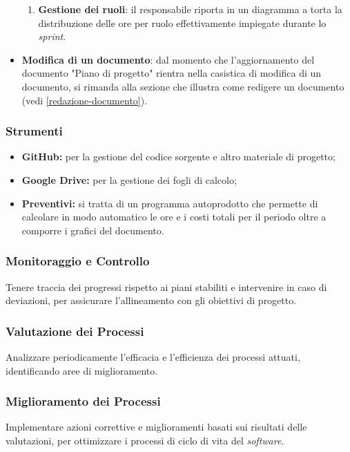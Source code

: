 \begin{itemize}
\begin{enumerate}
			\item \textbf{Gestione dei ruoli}: il responsabile riporta in
					un diagramma a torta la distribuzione delle ore per ruolo
					effettivamente impiegate durante lo \textit{sprint}.
		\end{enumerate}

	\item \textbf{Modifica di un documento}: dal momento che
		l'aggiornamento del documento "Piano di progetto" rientra nella
		casistica di modifica di un documento, si rimanda alla sezione
		che illustra come redigere un documento (vedi
		\ref{redazione-documento}).
\end{itemize}

\subsubsection*{Strumenti}
\begin{itemize}
	\item \textbf{GitHub\g:} per la gestione del codice sorgente e altro
		materiale di progetto;

	\item \textbf{Google Drive:} per la gestione dei fogli di calcolo;

	\item \textbf{Preventivi:} si tratta di un programma autoprodotto che
		permette di calcolare in modo automatico le ore e i costi totali per
		il periodo oltre a comporre i grafici del documento.
\end{itemize}
	  





\subsubsection{Monitoraggio e Controllo} 
Tenere traccia dei progressi
	  rispetto ai piani stabiliti e intervenire in caso di deviazioni, per
	  assicurare l'allineamento con gli obiettivi di progetto.

\subsubsection{Valutazione dei Processi} 
Analizzare periodicamente
	  l'efficacia e l'efficienza dei processi attuati, identificando aree di
	  miglioramento.

\subsubsection{Miglioramento dei Processi} 
Implementare azioni correttive e
	  miglioramenti basati sui risultati delle valutazioni, per ottimizzare
	  i processi di ciclo di vita del \textit{software}.




